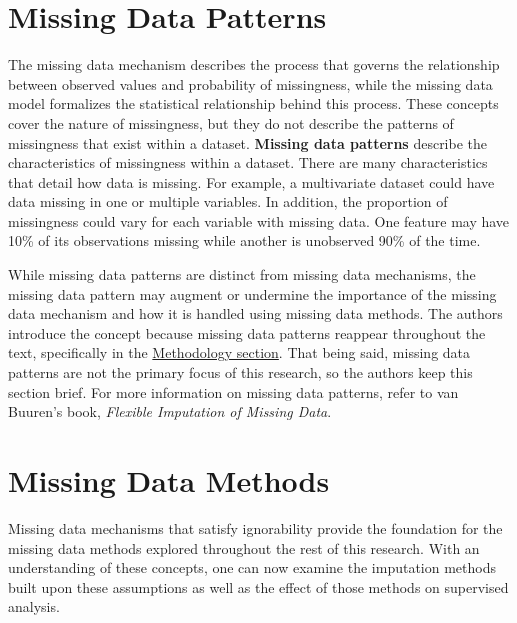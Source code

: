 \documentclass[12pt,oneside]{chicagocapstone}
\begin{document}
\section*{Missing Data Patterns}\label{background-missing-data-patterns}

The missing data mechanism describes the process that governs the
relationship between observed values and probability of missingness,
while the missing data model formalizes the statistical relationship
behind this process. These concepts cover the nature of missingness, but
they do not describe the patterns of missingness that exist within a
dataset. \textbf{Missing data patterns} describe the characteristics of
missingness within a dataset. There are many characteristics that detail
how data is missing. For example, a multivariate dataset could have data
missing in one or multiple variables. In addition, the proportion of
missingness could vary for each variable with missing data. One feature
may have 10\% of its observations missing while another is unobserved
90\% of the time.

While missing data patterns are distinct from missing data mechanisms,
the missing data pattern may augment or undermine the importance of the
missing data mechanism and how it is handled using missing data methods.
The authors introduce the concept because missing data patterns reappear
throughout the text, specifically in the
\protect\hyperlink{methodology}{Methodology section}. That being said,
missing data patterns are not the primary focus of this research, so the
authors keep this section brief. For more information on missing data
patterns, refer to van Buuren's book, \emph{Flexible Imputation of
Missing Data}.

\section*{Missing Data Methods}\label{background-missing-data-methods}

Missing data mechanisms that satisfy ignorability provide the foundation
for the missing data methods explored throughout the rest of this
research. With an understanding of these concepts, one can now examine
the imputation methods built upon these assumptions as well as the
effect of those methods on supervised analysis.
\end{document}
